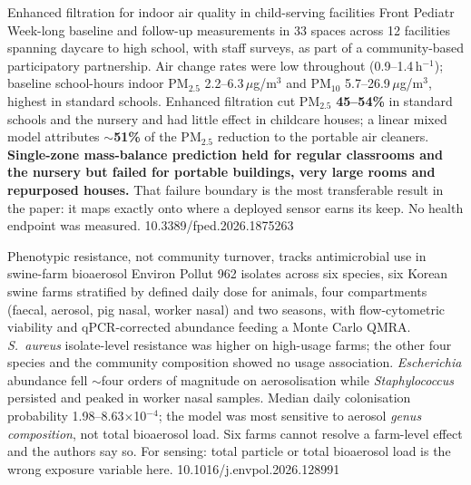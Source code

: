 \documentclass[10pt]{article}
\begin{document}
{Enhanced filtration for indoor air quality in child-serving facilities}
{Front Pediatr}
{Week-long baseline and follow-up measurements in 33 spaces across 12 facilities spanning
daycare to high school, with staff surveys, as part of a community-based participatory
partnership. Air change rates were low throughout (0.9--1.4\,h$^{-1}$); baseline school-hours
indoor PM$_{2.5}$ 2.2--6.3\,$\mu$g/m$^3$ and PM$_{10}$ 5.7--26.9\,$\mu$g/m$^3$, highest in
standard schools. Enhanced filtration cut PM$_{2.5}$ \textbf{45--54\%} in standard schools and
the nursery and had little effect in childcare houses; a linear mixed model attributes
\textbf{$\sim$51\%} of the PM$_{2.5}$ reduction to the portable air cleaners.
\textbf{Single-zone mass-balance prediction held for regular classrooms and the nursery but
failed for portable buildings, very large rooms and repurposed houses.} That failure boundary
is the most transferable result in the paper: it maps exactly onto where a deployed sensor
earns its keep. No health endpoint was measured.}
{10.3389/fped.2026.1875263}

{Phenotypic resistance, not community turnover, tracks antimicrobial use in swine-farm bioaerosol}
{Environ Pollut}
{962 isolates across six species, six Korean swine farms stratified by defined daily dose for
animals, four compartments (faecal, aerosol, pig nasal, worker nasal) and two seasons, with
flow-cytometric viability and qPCR-corrected abundance feeding a Monte Carlo QMRA.
\textit{S.\ aureus} isolate-level resistance was higher on high-usage farms; the other four
species and the community composition showed no usage association. \textit{Escherichia}
abundance fell $\sim$four orders of magnitude on aerosolisation while \textit{Staphylococcus}
persisted and peaked in worker nasal samples. Median daily colonisation probability
1.98--8.63$\times$10$^{-4}$; the model was most sensitive to aerosol \emph{genus composition},
not total bioaerosol load. Six farms cannot resolve a farm-level effect and the authors say
so. For sensing: total particle or total bioaerosol load is the wrong exposure variable here.}
{10.1016/j.envpol.2026.128991}

\clearpage

\end{document}
